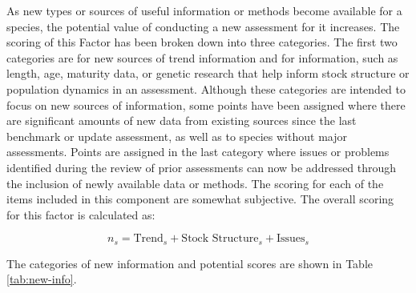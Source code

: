 \documentclass[11pt,
  english,
  a4paper,
]{article}
\begin{document}
\leavevmode\tagmcend\tagstructend


As new types or sources of useful information or methods become available for a species, the potential value of conducting a new assessment for it increases. The scoring of this Factor has been broken down into three categories. The first two categories are for new sources of trend information and for information, such as length, age, maturity data, or genetic research that help inform stock structure or population dynamics in an assessment. Although these categories are intended to focus on new sources of information, some points have been assigned where there are significant amounts of new data from existing sources since the last benchmark or update assessment, as well as to species without major assessments. Points are assigned in the last category where issues or problems identified during the review of prior assessments can now be addressed through the inclusion of newly available data or methods. The scoring for each of the items included in this component are somewhat subjective. The overall scoring for this factor is calculated as:

\leavevmode\tagmcend\tagstructend\par


{\[
n_s = \text{Trend}_s + \text{Stock Structure}_s + \text{Issues}_s
\]\leavevmode\tagmcend\tagstructend}

\leavevmode\tagmcend\tagstructend\par


The categories of new information and potential scores are shown in Table \ref{tab:new-info}.

\leavevmode\tagmcend\tagstructend\par

\begingroup\fontsize{10}{12}\selectfont
\begingroup\fontsize{10}{12}\selectfont
\end{document}
